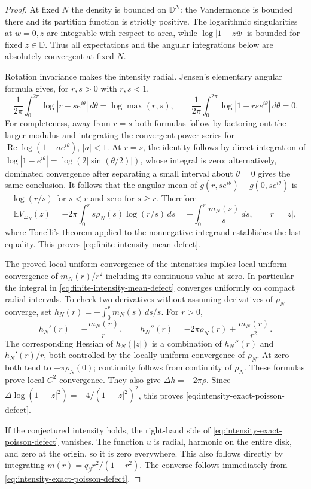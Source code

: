 \documentclass[11pt,a4paper]{article}
\numberwithin{equation}{section}
\theoremstyle{definition}
\theoremstyle{remark}
\newcommand{\D}{\mathbb D}
\begin{document}
\begin{proof}
At fixed $N$ the density is bounded on $\D^N$: the Vandermonde is
bounded there and its partition function is strictly positive.  The
logarithmic singularities at $w=0,z$ are integrable with respect to
area, while $\log|1-z\bar w|$ is bounded for fixed $z\in\D$.
Thus all expectations and the angular integrations below are absolutely
convergent at fixed $N$.

Rotation invariance makes the intensity radial.  Jensen's elementary
angular formula gives, for $r,s>0$ with $r,s<1$,
\[
 \frac1{2\pi}\int_0^{2\pi}\log|r-se^{i\theta}|\,d\theta
       =\log\max(r,s),\qquad
 \frac1{2\pi}\int_0^{2\pi}\log|1-rse^{i\theta}|\,d\theta=0.
\]
For completeness, away from $r=s$ both formulas follow by factoring out
the larger modulus and integrating the convergent power series for
$\operatorname{Re}\log(1-ae^{i\theta})$, $|a|<1$.  At $r=s$, the
identity follows by direct integration of
$\log|1-e^{i\theta}|=\log(2|\sin(\theta/2)|)$, whose integral is zero;
alternatively, dominated convergence after separating a small interval
about $\theta=0$ gives the same conclusion.  It follows that the
angular mean of $g(r,se^{i\theta})-g(0,se^{i\theta})$ is
$-\log(r/s)$ for $s<r$ and zero for $s\ge r$.  Therefore
\[
 \mathbb E V_{\Xi_N}(z)
 =-2\pi\int_0^r s\rho_N(s)\log(r/s)\,ds
 =-\int_0^r\frac{m_N(s)}s\,ds,
 \qquad r=|z|,
\]
where Tonelli's theorem applied to the nonnegative integrand establishes
the last equality.  This proves
\eqref{eq:finite-intensity-mean-defect}.

The proved local uniform convergence of the intensities implies local
uniform convergence of $m_N(r)/r^2$ including its continuous value at
zero.  In particular the integral in
\eqref{eq:finite-intensity-mean-defect} converges uniformly on compact
radial intervals.  To check two derivatives without assuming derivatives
of $\rho_N$ converge, set
$h_N(r)=-\int_0^r m_N(s)\,ds/s$.  For $r>0$,
\[
 h_N'(r)=-\frac{m_N(r)}r,\qquad
 h_N''(r)=-2\pi\rho_N(r)+\frac{m_N(r)}{r^2}.
\]
The corresponding Hessian of $h_N(|z|)$ is a combination of
$h_N''(r)$ and $h_N'(r)/r$, both controlled by the locally uniform
convergence of $\rho_N$.  At zero both tend to $-\pi\rho_N(0)$;
continuity follows from continuity of $\rho_N$.  These formulas prove
local $C^2$ convergence.  They also give
$\Delta h=-2\pi\rho$.  Since
$\Delta\log(1-|z|^2)=-4/(1-|z|^2)^2$, this proves
\eqref{eq:intensity-exact-poisson-defect}.

If the conjectured intensity holds, the right-hand side of
\eqref{eq:intensity-exact-poisson-defect} vanishes.  The function $u$
is radial, harmonic on the entire disk, and zero at the origin, so it
is zero everywhere.  This also follows directly by integrating
$m(r)=q_\beta r^2/(1-r^2)$.  The converse follows immediately from
\eqref{eq:intensity-exact-poisson-defect}.
\end{proof}
\end{document}

